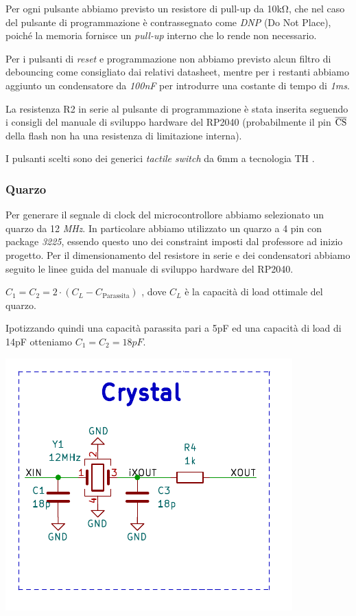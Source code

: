 Per ogni pulsante abbiamo previsto un resistore di pull-up da 10kΩ, che
nel caso del pulsante di programmazione è contrassegnato come \emph{DNP}
(Do Not Place), poiché la memoria fornisce un \emph{pull-up} interno che
lo rende non necessario.

Per i pulsanti di \emph{reset} e programmazione non abbiamo previsto
alcun filtro di debouncing come consigliato dai relativi datasheet,
mentre per i restanti abbiamo aggiunto un condensatore da \emph{100nF}
per introdurre una costante di tempo di \emph{1ms}.

La resistenza R2 in serie al pulsante di programmazione è stata inserita
seguendo i consigli del manuale di sviluppo hardware del RP2040
(probabilmente il pin $\overline{\rm {CS}}$ della flash non ha una
resistenza di limitazione interna).

I pulsanti scelti sono dei generici \emph{tactile switch} da 6mm a
tecnologia TH .

\hypertarget{quarzo}{%
\subsubsection{Quarzo}\label{quarzo}}

Per generare il segnale di clock del microcontrollore abbiamo
selezionato un quarzo da 12 \emph{MHz}. In particolare abbiamo
utilizzato un quarzo a 4 pin con package \emph{3225}, essendo questo uno
dei constraint imposti dal professore ad inizio progetto. Per il
dimensionamento del resistore in serie e dei condensatori abbiamo
seguito le linee guida del manuale di sviluppo hardware del RP2040.

\(C_{1} = C_{2} = 2 \cdot (C_{L} - C_{\text{Parassita}})\)
, dove \(C_{L}\) è la capacità di load ottimale del quarzo.

Ipotizzando quindi una capacità parassita pari a 5pF ed una capacità di
load di 14pF otteniamo \(C_{1} = C_{2} =18pF\).

\begin{center}
\includegraphics[scale=0.8]{figures/image76.png}
\captionsetup{type=figure}
\end{center}

